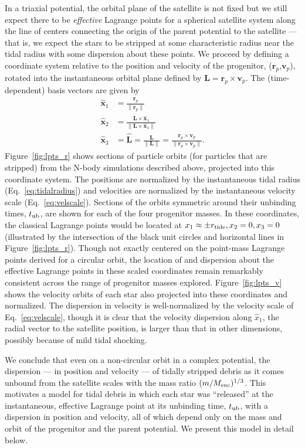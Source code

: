 \documentclass[letterpaper,12pt,preprint]{aastex}
\newcommand{\rtide}{r_{\rm tide}}
\newcommand{\bs}{\boldsymbol}
\newcommand{\tub}{t_{\rm ub}}
\begin{document}
In a triaxial potential, the orbital plane of the satellite is not fixed but we still expect there to be \emph{effective} Lagrange points for a spherical satellite system along the line of centers connecting the origin of the parent potential to the satellite --- that is, we expect the stars to be stripped at some characteristic radius near the tidal radius with some dispersion about these points. We proceed by defining a coordinate system relative to the position and velocity of the progenitor, ($\bs{r}_p$,$\bs{v}_p$), rotated into the instantaneous orbital plane defined by $\bs{L} = \bs{r}_p \times \bs{v}_p$. The (time-dependent) basis vectors are given by
\begin{align}
	\hat{\bs{x}}_1 &= \frac{\bs{r}_p}{\|\bs{r}_p\|}\label{eq:x1}\\
	\hat{\bs{x}}_2 &= \frac{\bs{L} \times \hat{\bs{x}}_1}{\|\bs{L} \times \hat{\bs{x}}_1\|}\\
	\hat{\bs{x}}_3 &= \hat{\bs{L}} = \frac{\bs{L}}{\|\bs{L}\|} = \frac{\bs{r}_p \times \bs{v}_p}{\|\bs{r}_p \times \bs{v}_p\|}\label{eq:x3}.
\end{align}
Figure~\ref{fig:lpts_r} shows sections of particle orbits (for particles that are stripped) from the N-body simulations described above, projected into this coordinate system. The positions are normalized by the instantaneous tidal radius (Eq.~\ref{eq:tidalradius}) and velocities are normalized by the instantaneous velocity scale (Eq.~\ref{eq:velscale}). Sections of the orbits symmetric around their unbinding times, $\tub$, are shown for each of the four progenitor masses. In these coordinates, the classical Lagrange points would be located at $x_1\approx\pm\rtide,x_2=0,x_3=0$ (illustrated by the intersection of the black unit circles and horizontal lines in Figure~\ref{fig:lpts_r}). Though not exactly centered on the point-mass Lagrange points derived for a circular orbit, the location of and dispersion about the effective Lagrange points in these scaled coordinates remain remarkably consistent across the range of progenitor masses explored. Figure~\ref{fig:lpts_v} shows the velocity orbits of each star also projected into these coordinates and normalized. The dispersion in velocity is well-normalized by the velocity scale of Eq.~\ref{eq:velscale}, though it is clear that the velocity dispersion along $\hat{x}_1$, the radial vector to the satellite position, is larger than that in other dimensions, possibly because of mild tidal shocking. 

We conclude that even on a non-circular orbit in a complex potential, the dispersion --- in position and velocity --- of tidally stripped debris as it comes unbound from the satellite scales with the mass ratio $(m / M_{\rm enc})^{1/3}$. This motivates a model for tidal debris in which each star was ``released'' at the instantaneous, effective Lagrange point at its unbinding time, $\tub$, with a dispersion in position and velocity, all of which depend only on the mass and orbit of the progenitor and the parent potential. We present this model in detail below.
\end{document}
